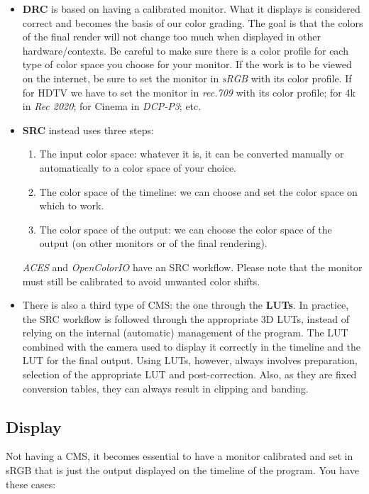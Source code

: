 \begin{itemize}
	\item \textbf{DRC} is based on having a calibrated monitor. What it displays is considered correct and becomes the basis of our color grading. The goal is that the colors of the final render will not change too much when displayed in other hardware/contexts. Be careful to make sure there is a color profile for each type of color space you choose for your monitor. If the work is to be viewed on the internet, be sure to set the monitor in \textit{sRGB} with its color profile. If for HDTV we have to set the monitor in \textit{rec.709} with its color profile; for 4k in \textit{Rec 2020}; for Cinema in \textit{DCP-P3}; etc.
	\item \textbf{SRC} instead uses three steps:
	\begin{enumerate}
		\item The input color space: whatever it is, it can be converted manually or automatically to a color space of your choice.
		\item The color space of the timeline: we can choose and set the color space on which to work.
		\item The color space of the output: we can choose the color space of the output (on other monitors or of the final rendering).
	\end{enumerate}
	\textit{ACES} and \textit{OpenColorIO} have an SRC workflow. Please note that the monitor must still be calibrated to avoid unwanted color shifts.
	\item There is also a third type of CMS: the one through the \textbf{LUTs}. In practice, the SRC workflow is followed through the appropriate 3D LUTs, instead of relying on the internal (automatic) management of the program. The LUT combined with the camera used to display it correctly in the timeline and the LUT for the final output. Using LUTs, however, always involves preparation, selection of the appropriate LUT and post-correction. Also, as they are fixed conversion tables, they can always result in clipping and banding.
\end{itemize}

\subsection{Display}%
\label{sub:display}

Not having \CGG{} a CMS, it becomes essential to have a monitor calibrated and set in sRGB that is just the output displayed on the timeline of the program. You have these cases:

